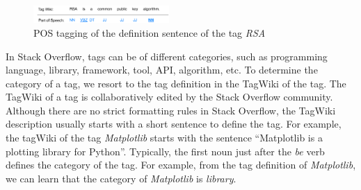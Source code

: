 \begin{figure}
	\centering
	\includegraphics[width=0.46\textwidth]{figures/pos.pdf}
	\vspace{-3mm}
	\caption{POS tagging of the definition sentence of the tag \textit{RSA}}
	\vspace{-2mm}
	\label{fig:exampleChunking}
\end{figure}
In Stack Overflow, tags can be of different categories, such as programming language, library, framework, tool, API, algorithm, etc.
To determine the category of a tag, we resort to the tag definition in the TagWiki of the tag.
The TagWiki of a tag is collaboratively edited by the Stack Overflow community.
Although there are no strict formatting rules in Stack Overflow, the TagWiki description usually starts with a short sentence to define the tag.
For example, the tagWiki of the tag \textit{Matplotlib} starts with the sentence ``Matplotlib is a plotting library for Python''.
Typically, the first noun just after the \textit{be} verb defines the category of the tag.
For example, from the tag definition of \textit{Matplotlib}, we can learn that the category of \textit{Matplotlib} is \textit{library}.

